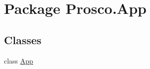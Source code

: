 \hypertarget{namespace_prosco_1_1_app}{\section{Package Prosco.\-App}
\label{namespace_prosco_1_1_app}
}
\subsection*{Classes}
\begin{DoxyCompactItemize}
\item 
class \hyperlink{class_prosco_1_1_app_1_1_app}{App}
\end{DoxyCompactItemize}
